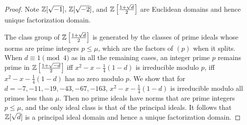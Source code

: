 \begin{proof}
Note $\mathbb{Z}[\sqrt{-1}],\,\mathbb{Z}[\sqrt{-2}]$, and $\mathbb{Z}\left[ {\frac{1+\sqrt{d}}{2}} \right]$ are Euclidean domains and hence unique factorization domain.

The class group of $\mathbb{Z}\left[ {\frac{1+\sqrt{d}}2} \right]$ is generated by the classes of prime ideals whose norms are prime integers $p\leq \mu$, which are the factors of $(p)$ when it splits. When $d\equiv 1\pmod{4}$ as in all the remaining cases, an integer prime $p$ remains prime in $\mathbb{Z}\left[ {\frac{1+\sqrt{-d}}2} \right]$  iff $x^2-x-\frac{1}{4}(1-d)$ is irreducible modulo $p$, iff $x^2-x-\frac{1}{4}(1-d)$ has no zero modulo $p$. We show that for $d=-7,-11,-19,-43,-67,-163$, $x^2-x-\frac{1}{4}(1-d)$ is irreducible modulo all primes less than $\mu$. Then no prime ideals have norms that are prime integers $p\leq\mu$, and the only ideal class is that of the principal ideals. It follows that $\mathbb{Z}[\sqrt{d}]$ is a principal ideal domain and hence a unique factorization domain.


\end{proof}

